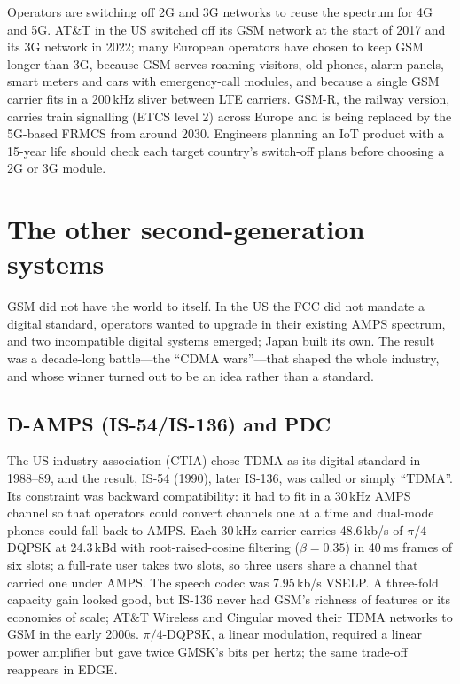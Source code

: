 \begin{inpractice}
Operators are switching off 2G and 3G networks to reuse the spectrum for 4G and 5G. AT\&T in the US
switched off its GSM network at the start of 2017 and its 3G network in 2022; many European
operators have chosen to keep GSM longer than 3G, because GSM serves roaming visitors, old phones,
alarm panels, smart meters and cars with emergency-call modules, and because a single GSM carrier
fits in a 200\,kHz sliver between LTE carriers. GSM-R, the railway version, carries train signalling
(ETCS level 2) across Europe and is being replaced by the 5G-based FRMCS from around 2030. Engineers
planning an IoT product with a 15-year life should check each target country's switch-off plans
before choosing a 2G or 3G module.
\end{inpractice}

\section{The other second-generation systems}
\label{sec:ch21:other2g}

GSM did not have the world to itself. In the US the FCC did not mandate a digital standard,
operators wanted to upgrade in their existing AMPS spectrum, and two incompatible digital systems
emerged; Japan built its own. The result was a decade-long battle---the ``CDMA wars''---that shaped
the whole industry, and whose winner turned out to be an idea rather than a standard.

\subsection{D-AMPS (IS-54/IS-136) and PDC}

The US industry association (CTIA) chose TDMA as its digital standard in 1988--89, and the result,
IS-54 (1990), later IS-136, was called  or simply ``TDMA''. Its constraint was backward
compatibility: it had to fit in a 30\,kHz AMPS channel so that operators could convert channels one
at a time and dual-mode phones could fall back to AMPS. Each 30\,kHz carrier carries 48.6\,kb/s of
$\pi/4$-DQPSK at 24.3\,kBd with root-raised-cosine filtering ($\beta=0.35$) in 40\,ms frames of six
slots; a full-rate user takes two slots, so three users share a channel that carried one under AMPS.
The speech codec was 7.95\,kb/s VSELP. A three-fold capacity gain looked good, but IS-136 never had
GSM's richness of features or its economies of scale; AT\&T Wireless and Cingular moved their TDMA
networks to GSM in the early 2000s. $\pi/4$-DQPSK, a linear modulation, required a linear power
amplifier but gave twice GMSK's bits per hertz; the same trade-off reappears in EDGE.

